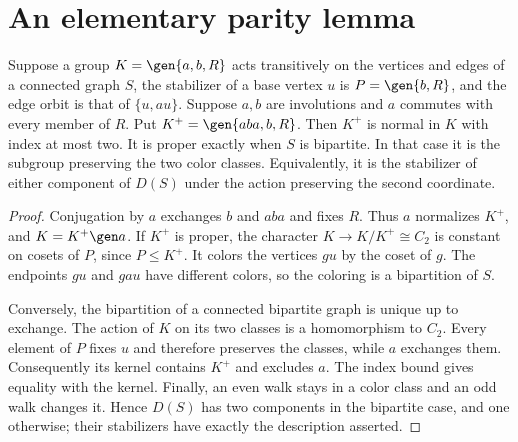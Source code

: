 \section{An elementary parity lemma}
\begin{lemma}\label{NC.parity}
Suppose a group $K=\gen{a,b,R}$ acts transitively on the vertices
and edges of a connected graph $S$, the stabilizer of a base vertex
$u$ is $P=\gen{b,R}$, and the edge orbit is that of $\{u,au\}$.
Suppose $a,b$ are involutions and $a$ commutes with every member
of $R$. Put $K^+=\gen{aba,b,R}$.
Then $K^+$ is normal in $K$ with index at most two.
It is proper exactly when $S$ is bipartite. In that case it is
the subgroup preserving the two color classes. Equivalently,
it is the stabilizer of either component of $D(S)$ under the
action preserving the second coordinate.
\end{lemma}
\begin{proof}
Conjugation by $a$ exchanges $b$ and $aba$ and fixes $R$.
Thus $a$ normalizes $K^+$, and $K=K^+\gen a$. If $K^+$ is proper,
the character $K\longrightarrow K/K^+\cong C_2$ is constant on
cosets of $P$, since $P\le K^+$. It colors the vertices $gu$
by the coset of $g$. The endpoints $gu$ and $gau$ have different
colors, so the coloring is a bipartition of $S$.

Conversely, the bipartition of a connected bipartite graph is
unique up to exchange. The action of $K$ on its two classes is
a homomorphism to $C_2$. Every element of $P$ fixes $u$ and
therefore preserves the classes, while $a$ exchanges them.
Consequently its kernel contains $K^+$ and excludes $a$.
The index bound gives equality with the kernel.
Finally, an even walk stays in a color class and an odd walk
changes it. Hence $D(S)$ has two components in the bipartite
case, and one otherwise; their stabilizers have exactly the
description asserted.
\end{proof}

